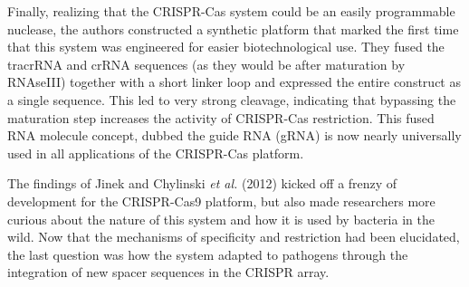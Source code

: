 Finally, realizing that the CRISPR-Cas system could be an easily programmable nuclease, the authors constructed a synthetic platform that marked the first time that this system was engineered for easier biotechnological use. They fused the tracrRNA and crRNA sequences (as they would be after maturation by RNAseIII) together with a short linker loop and expressed the entire construct as a single sequence. This led to very strong cleavage, indicating that bypassing the maturation step increases the activity of CRISPR-Cas restriction. This fused RNA molecule concept, dubbed the guide RNA (gRNA) is now nearly universally used in all applications of the CRISPR-Cas platform.

The findings of Jinek and Chylinski \textit{et al.} (2012) kicked off a frenzy of development for the CRISPR-Cas9 platform, but also made researchers more curious about the nature of this system and how it is used by bacteria in the wild. Now that the mechanisms of specificity and restriction had been elucidated, the last question was how the system adapted to pathogens through the integration of new spacer sequences in the CRISPR array.


